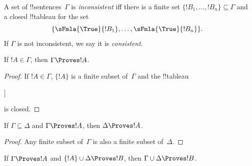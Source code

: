 \begin{defn}[Consistency]
A set of !!{sentence}s~$\Gamma$ is \emph{inconsistent} iff there is a
finite set $\{!B_1, \dots, !B_n\} \subseteq \Gamma$ and a closed
!!{tableau} for the set
\[
\{
  \sFmla{\True}{!B_1}, \dots,
  \sFmla{\True}{!B_n}  
  \}.
\]
If $\Gamma$ is not inconsistent, we say it is \emph{consistent}.
\end{defn}

\begin{prop}[Reflexivity]
If $!A \in \Gamma$, then $\Gamma \Proves !A$.
\end{prop}

\begin{proof}
If $!A \in \Gamma$, $\{!A\}$ is a finite subset of~$\Gamma$ and the !!{tableau}
\begin{oltableau}
  [\sFmla{\False}{\formula{A}}, just = \TAss
    [\sFmla{\True}{\formula{A}}, just = \TAss,close]
  ]
\end{oltableau}
is closed.
\end{proof}
  

\begin{prop}[Monotonicity]
If $\Gamma \subseteq \Delta$ and $\Gamma \Proves !A$, then $\Delta
\Proves !A$.
\end{prop}

\begin{proof}
Any finite subset of~$\Gamma$ is also a finite subset of~$\Delta$.
\end{proof}

\begin{prop}[Transitivity]
If $\Gamma \Proves !A$ and $\{!A\} \cup
\Delta \Proves !B$, then $\Gamma \cup \Delta \Proves !B$.
\end{prop}

